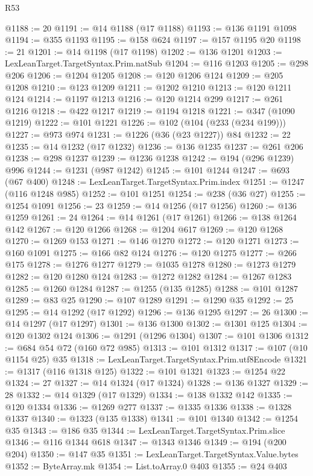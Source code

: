 \begin{lexlean}{R53}
\begin{coremodule}
@1188 := 20
@1191 := @14 @1188 (@17 @1188)
@1193 := @136 @1191 @1098
@1194 := @355 @1193
@1195 := @158 @624
@1197 := @157 @1195 @20
@1198 := 21
@1201 := @14 @1198 (@17 @1198)
@1202 := @136 @1201
@1203 := LexLeanTarget.TargetSyntax.Prim.natSub
@1204 := @116 @1203
@1205 := @298 @206
@1206 := @1204 @1205
@1208 := @120 @1206 @124
@1209 := @205 @1208
@1210 := @123 @1209
@1211 := @1202 @1210
@1213 := @120 @1211 @124
@1214 := @1197 @1213
@1216 := @120 @1214 @299
@1217 := @261 @1216
@1218 := @422 @1217
@1219 := @1194 @1218
@1221 := @347 (@1090 @1219)
@1222 := @101 @1221
@1226 := @102 (@104 (@233 (@234 @199)))
@1227 := @973 @974
@1231 := @1226 (@36 (@23 @1227)) @84
@1232 := 22
@1235 := @14 @1232 (@17 @1232)
@1236 := @136 @1235
@1237 := @261 @206
@1238 := @298 @1237
@1239 := @1236 @1238
@1242 := @194 (@296 @1239) @996
@1244 := @1231 (@987 @1242)
@1245 := @101 @1244
@1247 := @693 (@67 @400)
@1248 := LexLeanTarget.TargetSyntax.Prim.index
@1251 := @1247 (@116 @1248 @985)
@1252 := @101 @1251
@1254 := @238 (@36 @27)
@1255 := @1254 @1091
@1256 := 23
@1259 := @14 @1256 (@17 @1256)
@1260 := @136 @1259
@1261 := 24
@1264 := @14 @1261 (@17 @1261)
@1266 := @138 @1264 @142
@1267 := @120 @1266
@1268 := @1204 @617
@1269 := @120 @1268
@1270 := @1269 @153
@1271 := @146 @1270
@1272 := @120 @1271
@1273 := @160 @1091
@1275 := @166 @82 @124
@1276 := @120 @1275
@1277 := @266 @175
@1278 := @1276 @1277
@1279 := @1035 @1278
@1280 := @1273 @1279
@1282 := @120 @1280 @124
@1283 := @1272 @1282
@1284 := @1267 @1283
@1285 := @1260 @1284
@1287 := @1255 (@135 @1285)
@1288 := @101 @1287
@1289 := @83 @25
@1290 := @107 @1289
@1291 := @1290 @35
@1292 := 25
@1295 := @14 @1292 (@17 @1292)
@1296 := @136 @1295
@1297 := 26
@1300 := @14 @1297 (@17 @1297)
@1301 := @136 @1300
@1302 := @1301 @125
@1304 := @120 @1302 @124
@1306 := @1291 (@1296 @1304)
@1307 := @101 @1306
@1312 := @684 @54 @72 (@160 @72 @985)
@1313 := @101 @1312
@1317 := @107 (@10 @1154 @25) @35
@1318 := LexLeanTarget.TargetSyntax.Prim.utf8Encode
@1321 := @1317 (@116 @1318 @125)
@1322 := @101 @1321
@1323 := @1254 @22
@1324 := 27
@1327 := @14 @1324 (@17 @1324)
@1328 := @136 @1327
@1329 := 28
@1332 := @14 @1329 (@17 @1329)
@1334 := @138 @1332 @142
@1335 := @120 @1334
@1336 := @1269 @277
@1337 := @1335 @1336
@1338 := @1328 @1337
@1340 := @1323 (@135 @1338)
@1341 := @101 @1340
@1342 := @1254 @35
@1343 := @186 @35
@1344 := LexLeanTarget.TargetSyntax.Prim.slice
@1346 := @116 @1344 @618
@1347 := @1343 @1346
@1349 := @194 (@200 @204)
@1350 := @147 @35
@1351 := LexLeanTarget.TargetSyntax.Value.bytes
@1352 := ByteArray.mk
@1354 := List.toArray.{0} @403
@1355 := @24 @403

\end{coremodule}
\end{lexlean}

